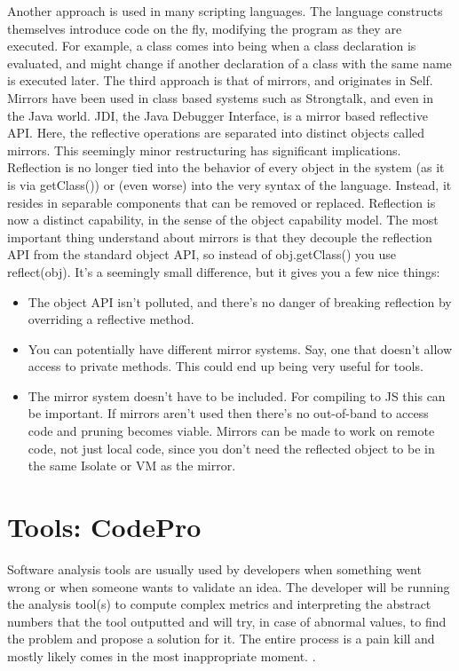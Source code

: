 	Another approach is used in many scripting languages. The language constructs themselves introduce code on the fly, modifying the program as they are executed. 
For example, a class comes into being when a class declaration is evaluated, and might change if another declaration of a class with the same name is executed later.
The third approach is that of mirrors, and originates in Self. Mirrors have
been used in class based systems such as Strongtalk, and even in the Java world. JDI, the Java Debugger Interface, is a mirror based reflective API. 
Here, the reflective operations are separated into distinct objects called mirrors. This seemingly minor restructuring has significant implications. 
Reflection is no longer tied into the behavior of every object in the system (as it is via getClass()) or (even worse) into the very syntax of the language.
Instead, it resides in separable components that can be removed or replaced. Reflection is now a distinct capability, in the sense of the object capability model.
	The most important thing understand about mirrors is that they decouple the reflection API from the standard object API, 
so instead of obj.getClass() you use reflect(obj). It's a seemingly small difference, but it gives you a few nice things:
	\begin{itemize}
		\item The object API isn't polluted, and there's no danger of breaking
reflection by overriding a reflective method.
		\item You can potentially have different mirror systems. Say, one that doesn't
allow access to private methods. This could end up being very useful for tools.
		\item The mirror system doesn't have to be included. For compiling to JS this
can be important. If mirrors aren't used then there's no out-of-band to access code and pruning becomes viable.
Mirrors can be made to work on remote code, not just local code, since you don't need the reflected object to be in the same Isolate or VM as the mirror.	
	\end{itemize}

\section{Tools: CodePro}\label{ch:2.2}

	Software analysis tools are usually used by developers when something went
wrong or when someone wants to validate an idea. The developer will be running
the analysis tool(s) to compute complex metrics and interpreting the abstract numbers 
that the tool outputted and will try, in case of abnormal values, to find the
problem and propose a solution for it. The entire process is a pain kill and
mostly likely comes in the most inappropriate moment. \cite{tools:inCode}.

